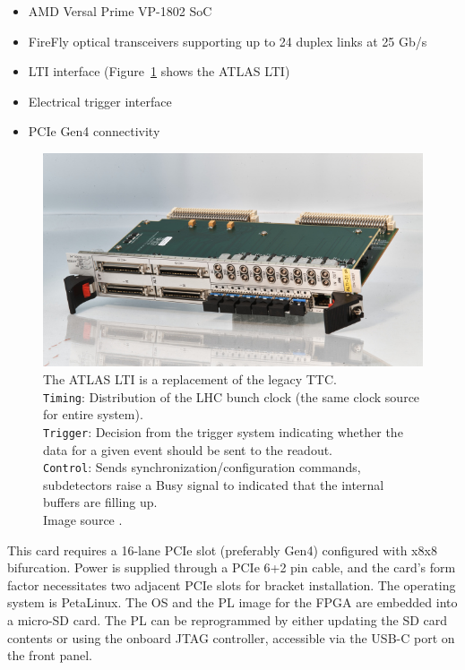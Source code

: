 \begin{itemize}
    \item AMD Versal Prime VP-1802 \acf{SoC}
    \item FireFly optical transceivers supporting up to 24 duplex links at 25 Gb/s \cite{firefly-optical-transceiver}
    \item \acf{LTI} interface (Figure~\ref{fig:ALTI} shows the \acs{ATLAS} \acl{LTI})
    \item Electrical trigger interface
    \item \acs{PCIe} Gen4 connectivity
\end{itemize}

\begin{figure}[htbp]
\centering
\includegraphics[width=\textwidth]{images/felix/lti.jpg}
\caption[ATLAS Local Trigger Interface]{The ATLAS \acl{LTI} is a replacement of the legacy \acf{TTC}.\\ \texttt{Timing}: Distribution of the \acs{LHC} bunch clock (the same clock source for entire system).\\\texttt{Trigger}: Decision from the trigger system indicating whether the data for a given event should be sent to the readout.\\ \texttt{Control}: Sends synchronization/configuration commands, subdetectors raise a Busy signal to indicated that the internal buffers are filling up.\\Image source \protect\cite{alti}.}
\label{fig:ALTI}
\end{figure}

This card requires a 16-lane \acs{PCIe} slot (preferably Gen4) configured with x8x8 bifurcation. Power is supplied through a \acs{PCIe} 6+2 pin cable, and the card's form factor necessitates two adjacent \acs{PCIe} slots for bracket installation. 
The operating system is PetaLinux. The OS and the \acl{PL} image for the \acs{FPGA} are embedded into a micro-SD card. The \acs{PL} can be reprogrammed by either updating the SD card contents or using the onboard \ac{JTAG} controller, accessible via the USB-C port on the front panel.


